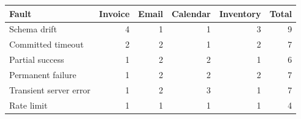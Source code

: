 \begin{tabular}{lrrrrr}\toprule
Fault & Invoice & Email & Calendar & Inventory & Total\\ \midrule
Schema drift & 4 & 1 & 1 & 3 & 9\\
Committed timeout & 2 & 2 & 1 & 2 & 7\\
Partial success & 1 & 2 & 2 & 1 & 6\\
Permanent failure & 1 & 2 & 2 & 2 & 7\\
Transient server error & 1 & 2 & 3 & 1 & 7\\
Rate limit & 1 & 1 & 1 & 1 & 4\\
\bottomrule\end{tabular}
